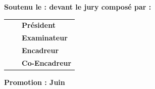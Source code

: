 \begin{titlepage}
	\vspace{2cm}
	
	\textbf{\normalsize Soutenu le : \Datestn \space devant le jury composé par :}\\
	
	\vspace{0.2cm}
	
	
	
	\begin{tabular}{>{\raggedright\arraybackslash}p{5cm}>{\raggedright\arraybackslash}p{5cm}>{\raggedright\arraybackslash}p{4cm}}
		\pres & \multirow{2}{*}{} & \textbf{Président}   \\
		\exam &                   & \textbf{Examinateur} \\
		\Nmp      &                   & \textbf{Encadreur} \\
		\ifx\Nmcp\undefined\else \Nmcp       &                   & \textbf{Co-Encadreur} 	\fi 
	\end{tabular}%

	\vspace{2cm}
	
	\textbf{\normalsize Promotion : Juin \Ann}\\
	
\end{titlepage}

\clearpage
\pagestyle{empty}